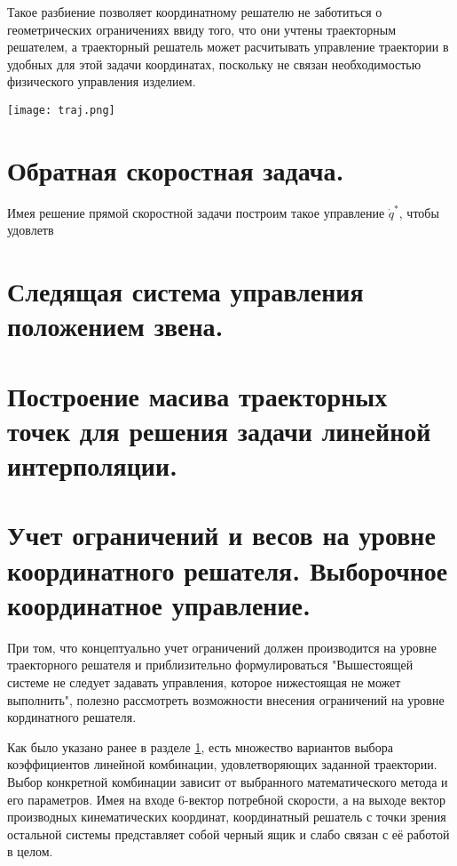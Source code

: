 \documentclass[12pt,a4paper,titlepage]{article}
\begin{document}
Такое разбиение позволяет координатному решателю не заботиться о геометрических ограничениях ввиду того, что они учтены траекторным решателем, а траекторный решатель может расчитывать управление траектории в удобных для этой задачи координатах, поскольку не связан необходимостью физического управления изделием.   

\begin{center}
  \texttt{[image: traj.png]}
  \label{}
\end{center}


\newpage
\section{Обратная скоростная задача.}\label{invspd_sect}

Имея решение прямой скоростной задачи построим такое управление $\dot{q}^{*}$, чтобы удовлетв 

\newpage
\section{Следящая система управления положением звена.}

\newpage
\section{Построение масива траекторных точек для решения задачи линейной интерполяции.}

\newpage
\section{Учет ограничений и весов на уровне координатного решателя. Выборочное координатное управление.}

При том, что концептуально учет ограничений должен производится на уровне траекторного решателя и приблизительно формулироваться "Вышестоящей системе не следует задавать управления, которое нижестоящая не может выполнить", полезно рассмотреть возможности внесения ограничений на уровне кординатного решателя.

Как было указано ранее в разделе \ref{invspd_sect}, есть множество вариантов выбора коэффициентов линейной комбинации, удовлетворяющих заданной траектории. Выбор конкретной комбинации зависит от выбранного математического метода и его параметров. Имея на входе 6-вектор потребной скорости, а на выходе вектор производных кинематических координат, координатный решатель с точки зрения остальной системы представляет собой черный ящик и слабо связан с её работой в целом.
\end{document}
